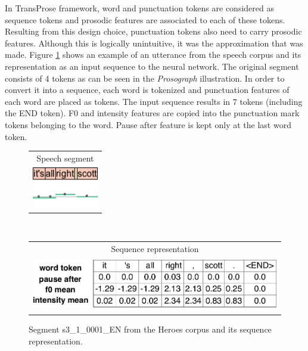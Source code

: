 In TransProse framework, word and punctuation tokens are considered as sequence tokens and prosodic features are associated to each of these tokens. Resulting from this design choice, punctuation tokens also need to carry prosodic features. Although this is logically unintuitive, it was the approximation that was made. Figure \ref{transprose:figure:q3:goodone2} shows an example of an utterance from the speech corpus and its representation as an input sequence to the neural network. The original segment consists of 4 tokens as can be seen in the \textit{Prosograph} illustration. In order to convert it into a sequence, each word is tokenized and punctuation features of each word are placed as tokens. The input sequence results in 7 tokens (including the END token). F0 and intensity features are copied into the punctuation mark tokens belonging to the word. Pause after feature is kept only at the last word token. 

\begin{figure}[h!]
\centering
\begin{minipage}[t]{0.37\textwidth}
\begin{tabular}{c}
Speech segment \\
\includegraphics[height=1.8cm]{img/s3_12_0124.png} \\
\end{tabular}
\end{minipage}
\\
\begin{minipage}[t]{\textwidth}
\begin{tabular}{c}
Sequence representation \\
\includegraphics[height=2.3cm]{img/s3_12_0124_assequence.pdf} \\
\end{tabular}
\end{minipage}
\caption{Segment s3\_1\_0001\_EN from the Heroes corpus and its sequence representation.}
\label{transprose:figure:q3:goodone2}
\end{figure}

